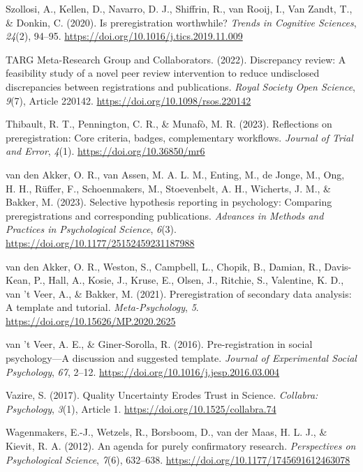 \documentclass[authordate, empirical]{jote-new-article}
\begin{document}
	Szollosi, A., Kellen, D., Navarro, D. J., Shiffrin, R., van Rooij, I., Van Zandt, T., \& Donkin, C. (2020). Is preregistration worthwhile? \emph{Trends in Cognitive Sciences}, \emph{24}(2), 94--95. \url{https://doi.org/10.1016/j.tics.2019.11.009}



	TARG Meta-Research Group and Collaborators. (2022). Discrepancy review: A feasibility study of a novel peer review intervention to reduce undisclosed discrepancies between registrations and publications. \emph{Royal Society Open Science}, \emph{9}(7), Article 220142. \url{https://doi.org/10.1098/rsos.220142}



	Thibault, R. T., Pennington, C. R., \& Munafò, M. R. (2023). Reflections on preregistration: Core criteria, badges, complementary workflows. \emph{Journal of Trial and Error}, \emph{4}(1). \url{https://doi.org/10.36850/mr6}



	van den Akker, O. R., van Assen, M. A. L. M., Enting, M., de Jonge, M., Ong, H. H., Rüffer, F., Schoenmakers, M., Stoevenbelt, A. H., Wicherts, J. M., \& Bakker, M. (2023). Selective hypothesis reporting in psychology: Comparing preregistrations and corresponding publications. \emph{Advances in Methods and Practices in Psychological Science}, \emph{6}(3). \url{https://doi.org/10.1177/25152459231187988}



	van den Akker, O. R., Weston, S., Campbell, L., Chopik, B., Damian, R., Davis-Kean, P., Hall, A., Kosie, J., Kruse, E., Olsen, J., Ritchie, S., Valentine, K. D., van 't Veer, A., \& Bakker, M. (2021). Preregistration of secondary data analysis: A template and tutorial. \emph{Meta-Psychology}, \emph{5}. \url{https://doi.org/10.15626/MP.2020.2625}



	van 't Veer, A. E., \& Giner-Sorolla, R. (2016). Pre-registration in social psychology—A discussion and suggested template. \emph{Journal of Experimental Social Psychology}, \emph{67}, 2--12. \url{https://doi.org/10.1016/j.jesp.2016.03.004}



	Vazire, S. (2017). Quality Uncertainty Erodes Trust in Science. \emph{Collabra: Psychology}, \emph{3}(1), Article 1. \url{https://doi.org/10.1525/collabra.74}



	Wagenmakers, E.-J., Wetzels, R., Borsboom, D., van der Maas, H. L. J., \& Kievit, R. A. (2012). An agenda for purely confirmatory research. \emph{Perspectives on Psychological Science}, \emph{7}(6), 632--638. \url{https://doi.org/10.1177/1745691612463078}
\end{document}

